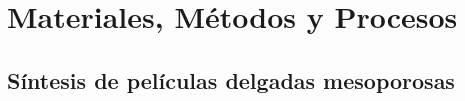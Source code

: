  \newcommand{\NoBiblioMat}[1]{
 \ifthenelse{\equal{#1}{verdadero}}{}{}
 \NoBiblioMat{verdadero}}


 \FormatoCapituloUnaLinea

 \chapter{Materiales, Métodos y Procesos}\label{chap:Materiales}

 \thispagestyle{empty}
	


 \vfill
 \minitoc
 \newpage


\section{Síntesis de películas delgadas mesoporosas}\label{sec:sintesis_mesoporosos}	
	
